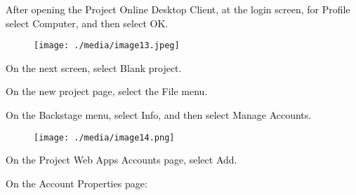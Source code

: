 \documentclass[12pt]{report}
\renewcommand{\_}{\kern-1.5pt\textunderscore\kern-1.5pt}
\begin{document}
	\item \textcolor[HTML]{0D0D0D}{ After opening the Project Online Desktop Client, at the login screen, for Profile select Computer, and then select OK.}\par




\begin{figure}[H]
\advance\leftskip 2.29in		\texttt{[image: ./media/image13.jpeg]}
\end{figure}



\par


\vspace{\baselineskip}
\vspace{\baselineskip}	\item \textcolor[HTML]{0D0D0D}{On the next screen, select Blank project.}\par

	\item \textcolor[HTML]{0D0D0D}{On the new project page, select the File menu.}\par

	\item \textcolor[HTML]{0D0D0D}{On the Backstage menu, select Info, and then select Manage Accounts.}\par




\begin{figure}[H]
\advance\leftskip 2.1in		\texttt{[image: ./media/image14.png]}
\end{figure}



\par


\vspace{\baselineskip}	\item \textcolor[HTML]{0D0D0D}{On the Project Web Apps Accounts page, select Add.}\par

	\item \textcolor[HTML]{0D0D0D}{On the Account Properties page:}\par
\end{document}
